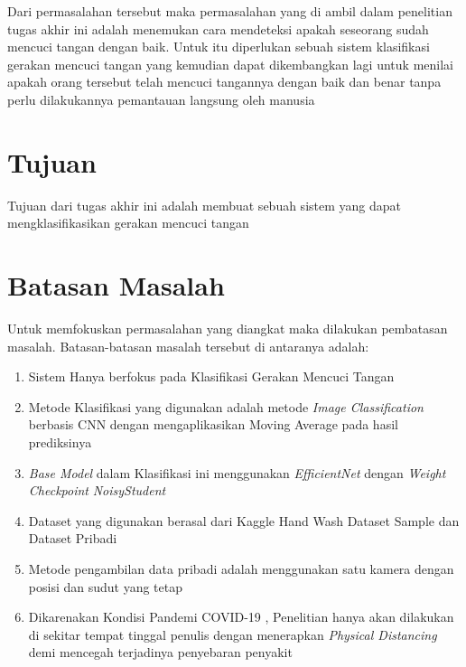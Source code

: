 Dari permasalahan tersebut maka permasalahan yang di ambil dalam penelitian tugas akhir ini adalah menemukan cara mendeteksi apakah seseorang sudah mencuci tangan dengan baik. Untuk itu diperlukan sebuah sistem klasifikasi gerakan mencuci tangan yang kemudian dapat dikembangkan lagi untuk menilai apakah orang tersebut telah mencuci tangannya dengan baik dan benar tanpa perlu dilakukannya pemantauan langsung oleh manusia

\section{Tujuan}
\label{sec:Tujuan}

Tujuan dari tugas akhir ini adalah membuat sebuah sistem yang dapat mengklasifikasikan gerakan mencuci tangan

\section{Batasan Masalah}
\label{sec:batasanmasalah}

Untuk memfokuskan permasalahan yang diangkat maka dilakukan pembatasan masalah. Batasan-batasan masalah tersebut di antaranya adalah:

\begin{enumerate}[nolistsep]
	
  \item Sistem Hanya berfokus pada Klasifikasi Gerakan Mencuci Tangan
  
  \item Metode Klasifikasi yang digunakan adalah metode \emph{Image Classification} berbasis CNN dengan mengaplikasikan Moving Average pada hasil prediksinya 
  
  \item \emph{Base Model} dalam Klasifikasi ini menggunakan \emph{EfficientNet}\cite{cit:effnet} dengan \emph{Weight Checkpoint} \emph{NoisyStudent}\cite{cit:noisy}
  
  \item Dataset yang digunakan berasal dari Kaggle Hand Wash Dataset Sample dan Dataset Pribadi

  \item Metode pengambilan data pribadi adalah menggunakan satu kamera dengan posisi dan sudut yang tetap
  
  \item Dikarenakan Kondisi Pandemi COVID-19 \cite{cit:copid}, Penelitian hanya akan dilakukan di sekitar tempat tinggal penulis dengan menerapkan \emph{Physical Distancing} demi mencegah terjadinya penyebaran penyakit
  
\end{enumerate}


